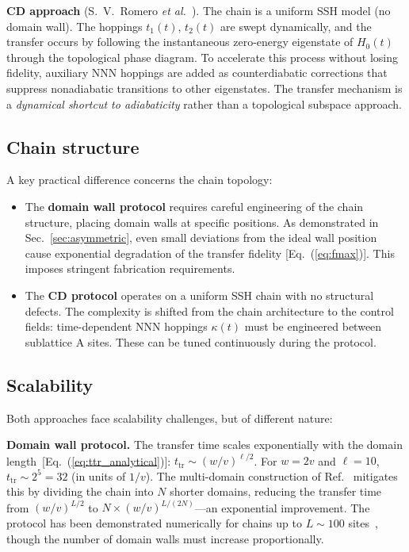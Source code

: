 \documentclass[
  reprint,
  amsmath,
  amssymb,
  aps,
  prb,
  floatfix,
  longbibliography,
]{revtex4-2}
\newcommand{\ttr}{t_{\mathrm{tr}}}
\begin{document}
\textbf{CD approach} (S.~V.~Romero \textit{et al.}~\cite{Romero2024}).
The chain is a uniform SSH model (no domain wall). The hoppings $t_1(t)$,
$t_2(t)$ are swept dynamically, and the transfer occurs by following the
instantaneous zero-energy eigenstate of $H_0(t)$ through the topological
phase diagram. To accelerate this process without losing fidelity, auxiliary
NNN hoppings are added as counterdiabatic corrections that suppress
nonadiabatic transitions to other eigenstates. The transfer mechanism is
a \emph{dynamical shortcut to adiabaticity} rather than a topological
subspace approach.

\subsection{Chain structure}
\label{sec:comp_structure}

A key practical difference concerns the chain topology:

\begin{itemize}
  \item The \textbf{domain wall protocol} requires careful engineering of the
    chain structure, placing domain walls at specific positions. As demonstrated
    in Sec.~\ref{sec:asymmetric}, even small deviations from the ideal wall
    position cause exponential degradation of the transfer fidelity
    [Eq.~(\ref{eq:fmax})]. This imposes stringent fabrication requirements.
  \item The \textbf{CD protocol} operates on a uniform SSH chain with no
    structural defects. The complexity is shifted from the chain architecture
    to the control fields: time-dependent NNN hoppings $\kappa(t)$ must be
    engineered between sublattice A sites. These can be tuned continuously
    during the protocol.
\end{itemize}

\subsection{Scalability}
\label{sec:comp_scalability}

Both approaches face scalability challenges, but of different nature:

\textbf{Domain wall protocol.}
The transfer time scales exponentially with the domain
length~[Eq.~(\ref{eq:ttr_analytical})]:
$\ttr \sim (w/v)^{\ell/2}$. For $w = 2v$ and $\ell = 10$,
$\ttr \sim 2^5 = 32$ (in units of $1/v$). The multi-domain construction
of Ref.~\cite{Zurita2023} mitigates this by dividing the chain into
$N$ shorter domains, reducing the transfer time from
$(w/v)^{L/2}$ to $N \times (w/v)^{L/(2N)}$---an exponential improvement.
The protocol has been demonstrated numerically for chains up to
$L \sim 100$ sites~\cite{Zurita2023}, though the number of domain walls
must increase proportionally.
\end{document}
